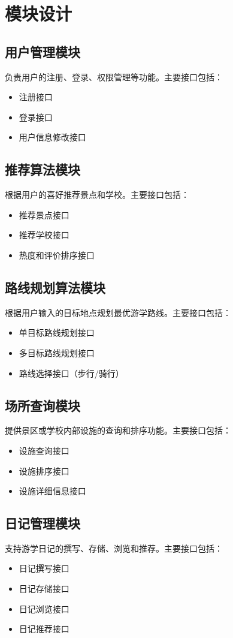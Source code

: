 \documentclass{ctexart}
\begin{document}
\section{模块设计}

\subsection{用户管理模块}
负责用户的注册、登录、权限管理等功能。主要接口包括：
\begin{itemize}
    \item 注册接口
    \item 登录接口
    \item 用户信息修改接口
\end{itemize}

\subsection{推荐算法模块}
根据用户的喜好推荐景点和学校。主要接口包括：
\begin{itemize}
    \item 推荐景点接口
    \item 推荐学校接口
    \item 热度和评价排序接口
\end{itemize}

\subsection{路线规划算法模块}
根据用户输入的目标地点规划最优游学路线。主要接口包括：
\begin{itemize}
    \item 单目标路线规划接口
    \item 多目标路线规划接口
    \item 路线选择接口（步行/骑行）
\end{itemize}

\subsection{场所查询模块}
提供景区或学校内部设施的查询和排序功能。主要接口包括：
\begin{itemize}
    \item 设施查询接口
    \item 设施排序接口
    \item 设施详细信息接口
\end{itemize}

\subsection{日记管理模块}
支持游学日记的撰写、存储、浏览和推荐。主要接口包括：
\begin{itemize}
    \item 日记撰写接口
    \item 日记存储接口
    \item 日记浏览接口
    \item 日记推荐接口
\end{itemize}
\end{document}
